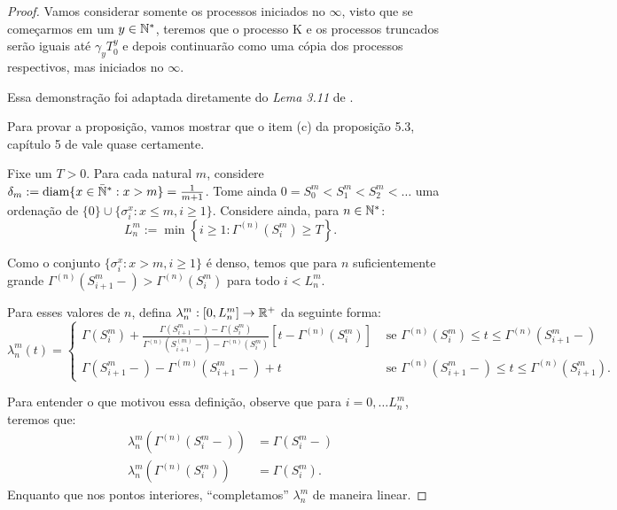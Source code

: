 \begin{proof}
  Vamos considerar somente os processos iniciados no $\infty$, visto
  que se começarmos em um $y \in {\mathbb{N^*}}$, teremos que o processo K e os
  processos truncados serão iguais até $\gamma_y T^y_0$ e depois
  continuarão como uma cópia dos processos respectivos, mas iniciados
  no $\infty$.

  Essa demonstração foi adaptada diretamente do \emph{Lema 3.11} de
  \cite{fontes:08}.

  Para provar a proposição, vamos mostrar que o item (c) da proposição
  5.3, capítulo 5 de \cite{ethier:86} vale quase certamente.

  Fixe um $T > 0$. Para cada natural $m$, considere $\delta_m :=
  {\mathrm{diam}}\{ x \in {\mathbb{\bar{N}^*}}: x > m \} = \frac{1}{m+1}$. Tome ainda $0 = S_0^m
  < S_1^m < S_2^m < \ldots $ uma ordenação de $\{0\}\cup\{ \sigma^x_i
  : x \leq m, i \geq 1\}$. Considere ainda, para $n \in {\mathbb{N^*}}$:
  \begin{displaymath}
    L^m_n := \min \left\{ i \geq 1: \Gamma^{(n)}(S^m_i) \geq T \right\}.
  \end{displaymath}

  Como o conjunto $\{\sigma_i^x: x > m, i\geq 1\}$ é denso, temos
  que para $n$ suficientemente grande $\Gamma^{(n)}(S^m_{i+1}-) >
  \Gamma^{(n)}(S^m_i)$ para todo $i < L^m_n$.

  Para esses valores de $n$, defina $\lambda_n^m: [0, L_n^m] \to {\mathbb{R}}^+$
  da seguinte forma:
  \begin{displaymath}
    \lambda_n^m(t) = \begin{cases}
      \Gamma(S_i^m) + \frac{\Gamma(S_{i+1}^m-) - \Gamma(S_i^m)}
      {\Gamma^{(n)}(S_{i+1}^{(m)} -) - \Gamma^{(n)}(S_i^m)}
      \left[t - \Gamma^{(n)}(S_i^m)\right]
      & \textrm{ se }
      \Gamma^{(n)}(S_i^m) \leq t \leq \Gamma^{(n)}(S_{i+1}^m-) \\
      \Gamma(S_{i+1}^m-) - \Gamma^{(m)}(S_{i+1}^m-) + t
      & \textrm{ se }
      \Gamma^{(n)}(S_{i+1}^m-) \leq t \leq \Gamma^{(n)}(S_{i+1}^m).
    \end{cases}
  \end{displaymath}

  Para entender o que motivou essa definição, observe que para $i = 0,
  \ldots L_n^m$, teremos que:
  \begin{align*}
    \lambda_n^m(\Gamma^{(n)}(S_i^m-)) &= \Gamma(S_i^m-)\\
    \lambda_n^m(\Gamma^{(n)}(S_i^m)) &= \Gamma(S_i^m).
  \end{align*}
  Enquanto que nos pontos interiores, ``completamos'' $\lambda_n^m$ de
  maneira linear.


\end{proof}
